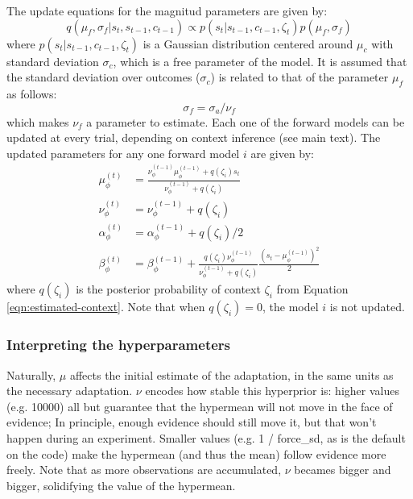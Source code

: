 \documentclass[a4paper,doc,floatsintext,natbib]{apa6}
\def \eref #1{Equation \ref{#1}}   %
\begin{document}
The update equations for the magnitud parameters are given by:
\begin{equation}
q(\mu_f, \sigma_f | s_t, s_{t-1}, c_{t-1}) \propto p(s_t |
s_{t-1}, c_{t-1}, \zeta_t)p(\mu_f, \sigma_f) \label{eqn:context-from-x}
\end{equation}
where $p(s_t | s_{t-1}, c_{t-1}, \zeta_t)$ is a Gaussian distribution centered
around $\mu_c$ with standard deviation $\sigma_c$, which is a free parameter of
the model. It is assumed that the standard deviation over outcomes ($\sigma_c$)
is related to that of the parameter $\mu_f$ as follows:
\begin{equation}
\sigma_f = \sigma_a / \nu_f
\end{equation}
which makes $\nu_f$ a parameter to estimate. Each one of the forward models can
be updated at every trial, depending on context inference (see main text). The
updated parameters for any one forward model $i$ are given by:
\begin{align}
  \mu_\phi^{(t)} &= \frac{\nu_\phi^{(t-1)} \mu_\phi^{(t-1)} + q(\zeta_i)s_t}{\nu_\phi^{(t-1)} + q(\zeta_i)} \\
  \nu_\phi^{(t)} &= \nu_\phi^{(t-1)} + q(\zeta_i) \\
  \alpha_\phi^{(t)} &= \alpha_\phi^{(t-1)} + q(\zeta_i) / 2 \\
  \beta_\phi^{(t)} &= \beta_\phi^{(t-1)} + \frac{q(\zeta_i)\nu_\phi^{(t-1)}}{\nu_\phi^{(t-1)} +
                  q(\zeta_i)}\frac{\left(s_t - \mu_\phi^{(t-1)}\right)^2}{2}
\end{align}
where $q(\zeta_i)$ is the posterior probability of context $\zeta_i$ from
\eref{eqn:estimated-context}. Note that when $q(\zeta_i) = 0$, the model $i$ is not
updated.

\subsubsection{Interpreting the hyperparameters}
\label{sec:interpreting-hyperparameters}
Naturally, $\mu$ affects the initial estimate of the adaptation, in the same
units as the necessary adaptation. $\nu$ encodes how stable this hyperprior is:
higher values (e.g. 10000) all but guarantee that the hypermean will not move
in the face of evidence; In principle, enough evidence should still move it,
but that won't happen during an experiment. Smaller values (e.g. 1 / force\_sd,
as is the default on the code) make the hypermean (and thus the mean) follow
evidence more freely. Note that as more observations are accumulated, $\nu$
becames bigger and bigger, solidifying the value of the hypermean.
\end{document}
